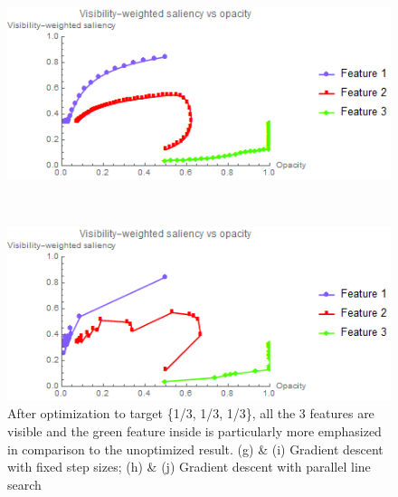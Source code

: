\begin{figure}
	\begin{minipage}{.49\textwidth}
		\includegraphics[width=1\linewidth]{images/vortex_naive_saliencyopacity_fixed}
		\subcaption{}
	\end{minipage}~
	\begin{minipage}{.49\textwidth}
		\includegraphics[width=1\linewidth]{images/vortex_naive_saliencyopacity_parallelsearch}
		\subcaption{}
	\end{minipage}
	\caption[After optimization to target \{1/3, 1/3, 1/3\}, all the 3 features are visible and the green feature inside is particularly more emphasized in comparison to the unoptimized result.]{After optimization to target \{1/3, 1/3, 1/3\}, all the 3 features are visible and the green feature inside is particularly more emphasized in comparison to the unoptimized result. (g) \& (i) Gradient descent with fixed step sizes; (h) \& (j) Gradient descent with parallel line search}
	\label{fig:vortex_naive_optimized}
\end{figure}

